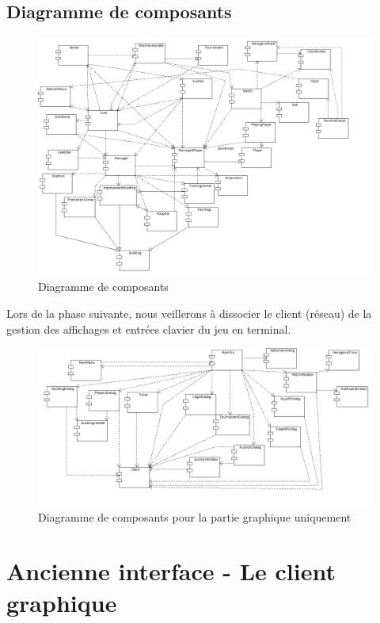 \documentclass[a4paper,titlepage]{scrreprt}
\begin{document}
\subsection{Diagramme de composants}
      \begin{figure}[H]
    \center
    \includegraphics[scale=0.4]{uml/Diagrammededeploiement.png}
    \caption{Diagramme de composants}
    \end{figure}
    Lors de la phase suivante, nous veillerons à dissocier le client (réseau) de la gestion des affichages et entrées clavier du jeu en terminal.
    \begin{figure}[H]
    \center
    \includegraphics[scale=0.3]{uml/GUIComponents.png}
    \caption{Diagramme de composants pour la partie graphique uniquement}
    \end{figure}
\newpage

\section{Ancienne interface - Le client graphique} \label{diag-client-graphique}
\end{document}
